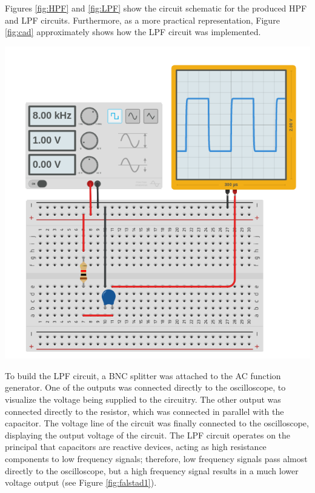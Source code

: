 \documentclass[journal]{IEEEtran}
\begin{document}
\noindent Figures \ref{fig:HPF} and \ref{fig:LPF} show the circuit schematic for the produced HPF and LPF circuits. Furthermore, as a more practical representation, Figure \ref{fig:cad} approximately shows how the LPF circuit was implemented. 

\begingroup
    \medskip
    \centering
    \includegraphics[width=\columnwidth]{images/lab4_7.png}
    \label{fig:cad}
    \medskip
\endgroup

\noindent To build the LPF circuit, a BNC splitter was attached to the AC function generator. One of the outputs was connected directly to the oscilloscope, to visualize the voltage being supplied to the circuitry. The other output was connected directly to the resistor, which was connected in parallel with the capacitor. The voltage line of the circuit was finally connected to the oscilloscope, displaying the output voltage of the circuit. The LPF circuit operates on the principal that capacitors are reactive devices, acting as high resistance components to low frequency signals; therefore, low frequency signals pass almost directly to the oscilloscope, but a high frequency signal results in a much lower voltage output (see Figure \ref{fig:falstad1}).
\end{document}

